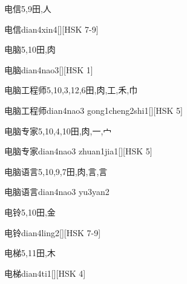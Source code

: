 \begin{Entry}{电信}{5,9}{⽥,⼈}
  \begin{Phonetics}{电信}{dian4xin4}[][HSK 7-9]
  \end{Phonetics}
\end{Entry}

\begin{Entry}{电脑}{5,10}{⽥,⾁}
  \begin{Phonetics}{电脑}{dian4nao3}[][HSK 1]
  \end{Phonetics}
\end{Entry}

\begin{Entry}{电脑工程师}{5,10,3,12,6}{⽥,⾁,⼯,⽲,⼱}
  \begin{Phonetics}{电脑工程师}{dian4nao3 gong1cheng2shi1}[][HSK 5]
  \end{Phonetics}
\end{Entry}

\begin{Entry}{电脑专家}{5,10,4,10}{⽥,⾁,⼀,⼧}
  \begin{Phonetics}{电脑专家}{dian4nao3 zhuan1jia1}[][HSK 5]
  \end{Phonetics}
\end{Entry}

\begin{Entry}{电脑语言}{5,10,9,7}{⽥,⾁,⾔,⾔}
  \begin{Phonetics}{电脑语言}{dian4nao3 yu3yan2}
  \end{Phonetics}
\end{Entry}

\begin{Entry}{电铃}{5,10}{⽥,⾦}
  \begin{Phonetics}{电铃}{dian4ling2}[][HSK 7-9]
  \end{Phonetics}
\end{Entry}

\begin{Entry}{电梯}{5,11}{⽥,⽊}
  \begin{Phonetics}{电梯}{dian4ti1}[][HSK 4]
  \end{Phonetics}
\end{Entry}

